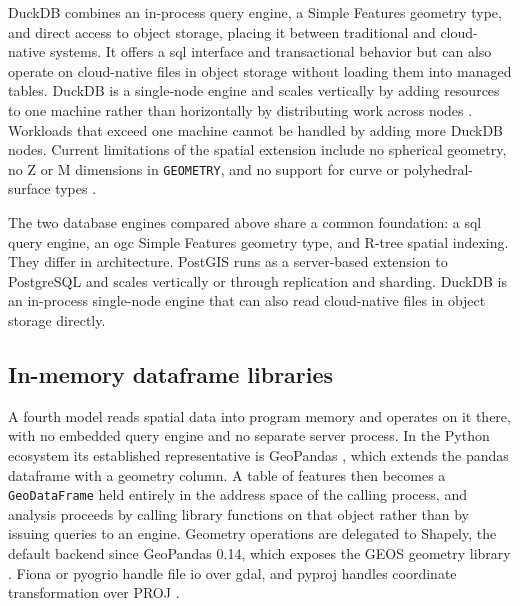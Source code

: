 DuckDB combines an in-process query engine, a Simple Features geometry type, and direct access to object storage, placing it between traditional and cloud-native systems. It offers a \acrshort{sql} interface and transactional behavior but can also operate on cloud-native files in object storage without loading them into managed tables. DuckDB is a single-node engine and scales vertically by adding resources to one machine rather than horizontally by distributing work across nodes \parencite{duckdb2025_scalability_faq}. Workloads that exceed one machine cannot be handled by adding more DuckDB nodes. Current limitations of the spatial extension include no spherical geometry, no Z or M dimensions in \texttt{GEOMETRY}, and no support for curve or polyhedral-surface types \parencite{gabrielsson2023_postgeese_duckdb_spatial_extension, duckdb2025_spatial_extension_overview}.

The two database engines compared above share a common foundation: a \acrshort{sql} query engine, an \acrshort{ogc} Simple Features geometry type, and R-tree spatial indexing. They differ in architecture. PostGIS runs as a server-based extension to PostgreSQL and scales vertically or through replication and sharding. DuckDB is an in-process single-node engine that can also read cloud-native files in object storage directly.

\subsection{In-memory dataframe libraries}
\label{background:spatial-data-formats-and-storage-models:in-memory-dataframe-libraries}

A fourth model reads spatial data into program memory and operates on it there, with no embedded query engine and no separate server process. In the Python ecosystem its established representative is GeoPandas \parencite{jordahl2024_geopandas}, which extends the pandas dataframe \parencite{mckinney2010_data_structures_statistical_computing} with a geometry column. A table of features then becomes a \texttt{GeoDataFrame} held entirely in the address space of the calling process, and analysis proceeds by calling library functions on that object rather than by issuing queries to an engine. Geometry operations are delegated to Shapely, the default backend since GeoPandas 0.14, which exposes the GEOS geometry library \parencite{geopandas2024_pygeos_to_shapely}. Fiona or pyogrio handle file \acrshort{io} over \acrshort{gdal}, and pyproj handles coordinate transformation over PROJ \parencite{jordahl2024_geopandas}.

